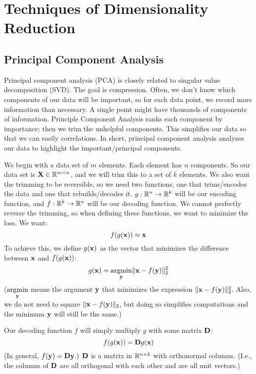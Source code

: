 
\chapter{Techniques of Dimensionality Reduction} \label{dim-reduction}

\section{Principal Component Analysis}

Principal component analysis (PCA) is closely related to singular value decomposition (SVD).  The goal is compression.  Often, we don't know which components of our data will be important, so for each data point, we record more information than necessary.  A single point might have thousands of components of information.  Principle Component Analysis ranks each component by importance; then we trim the unhelpful components.  This simplifies our data so that we can easily correlations.  In short, principal component analysis analyzes our data to highlight the important/principal components.

We begin with a data set of $m$ elements.  Each element has $n$ components.  So our data set is $\MX \in \R^{m \times n}$, and we will trim this to a set of $k$ elements.  We also want the trimming to be reversible, so we need two functions, one that trims/encodes the data and one that rebuilds/decodes it.  $g: \R^n \to \R^k$ will be our encoding function, and $f: \R^k \to \R^n$ will be our decoding function.
We cannot perfectly reverse the trimming, so when defining these functions, we want to minimize the loss.  We want:
$$f(g(\vx)) \approx \vx$$
To achieve this, we define $g(\vx)$ as the vector that minimizes the difference between $\vx$ and $f(g(\vx))$:
$$g(\vx) = \underset{\vy}{\argmin} \|\vx - f(\vy)\|^2_2$$
($\underset{\vy}{\argmin}$ means the argument $\vy$ that minimizes the expression $\|\vx - f(\vy)\|^2_2$.  Also, we do not need to square $\|\vx - f(\vy)\|_2$, but doing so simplifies computations and the minimum $\vy$ will still be the same.)

Our decoding function $f$ will simply multiply $g$ with some matrix $\MD$:
$$f(g(\vx)) = \MD g(\vx)$$
(In general, $f(\vy) = \MD \vy.)$  $\MD$ is a matrix in $\R^{n \times k}$ with orthonormal columns.  (I.e., the columns of $\MD$ are all orthogonal with each other and are all unit vectors.)

